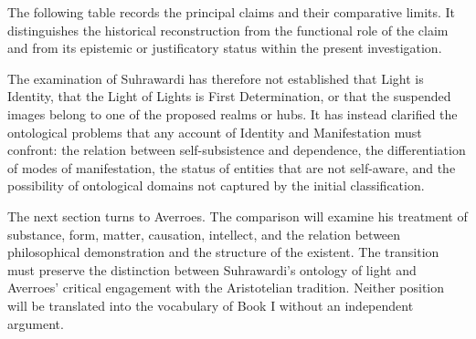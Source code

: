 \label{para:VS.B01.P01.C08.S14.SS20.P003}

The following table records the principal
claims and their comparative
limits. It distinguishes
the historical reconstruction
from the functional role
of the claim and from
its epistemic or justificatory
status within the present
investigation.



\label{para:VS.B01.P01.C08.S14.SS20.P004}

The examination of Suhrawardi has therefore
not established that Light
is Identity, that the
Light of Lights is
First Determination, or
that the suspended images
belong to one of the
proposed realms or hubs.
It has instead clarified
the ontological problems
that any account of
Identity and Manifestation
must confront: the
relation between self-subsistence
and dependence, the
differentiation of modes
of manifestation, the
status of entities that
are not self-aware, and
the possibility of
ontological domains
not captured by the
initial classification.

\label{para:VS.B01.P01.C08.S14.SS20.P005}

The next section turns to Averroes.
The comparison will examine
his treatment of substance,
form, matter, causation,
intellect, and the relation
between philosophical
demonstration and the
structure of the existent.
The transition must preserve
the distinction between
Suhrawardi's ontology
of light and Averroes'
critical engagement with
the Aristotelian tradition.
Neither position will be
translated into the
vocabulary of Book I
without an independent
argument.

